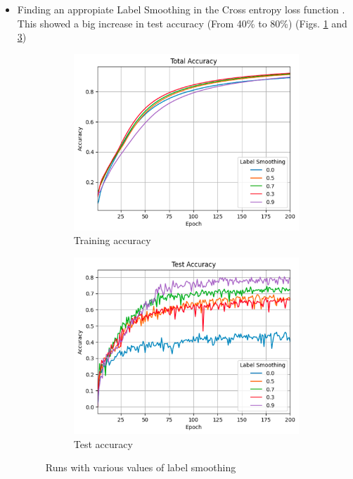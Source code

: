 \documentclass[11pt, a4paper, oneside]{assets/tex/thesis} %
\begin{document}
{\begin{itemize}
    \item Finding an appropiate Label Smoothing in the Cross entropy loss function \cite{szegedy2015rethinking}. This showed a big increase in test accuracy (From 40\% to 80\%) (Figs. \ref{fig:label_smoothing_total} and \ref{fig:label_smoothing_test})
    \begin{figure}[h]
        \centering
        \begin{subfigure}[b]{0.5\textwidth}
            \centering
            \includegraphics[width=\textwidth]{assets/img/label_smoothing_total.png}
            \caption{Training accuracy}
            \label{fig:label_smoothing_total}
        \end{subfigure}%
        \hfill
        \begin{subfigure}[b]{0.5\textwidth}
            \centering
            \includegraphics[width=\textwidth]{assets/img/label_smoothing_test.png}
            \caption{Test accuracy}
            \label{fig:label_smoothing_test}
        \end{subfigure}%
        \caption{Runs with various values of label smoothing}
    \end{figure}


\end{itemize}}
\end{document}
